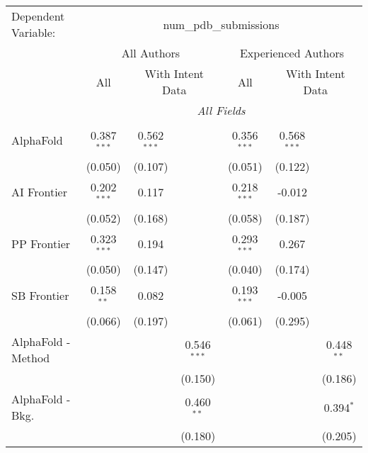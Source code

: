 \begingroup
\centering
\begin{tabular}{lcccccc}
   \tabularnewline \midrule \midrule
   Dependent Variable: & \multicolumn{6}{c}{num\_pdb\_submissions}\\
 & \multicolumn{3}{c}{All Authors} & \multicolumn{3}{c}{Experienced Authors} \\
\cmidrule(lr){2-4} \cmidrule(lr){5-7}
 & \multicolumn{1}{c}{All} & \multicolumn{2}{c}{With Intent Data} & \multicolumn{1}{c}{All} & \multicolumn{2}{c}{With Intent Data} \\
\cmidrule(lr){2-2} \cmidrule(lr){3-4} \cmidrule(lr){5-5} \cmidrule(lr){6-7}
 & \multicolumn{6}{c}{\textit{All Fields}} \\ \\
   AlphaFold                     & 0.387$^{***}$ & 0.562$^{***}$ &               & 0.356$^{***}$ & 0.568$^{***}$ &   \\   
                                 & (0.050)       & (0.107)       &               & (0.051)       & (0.122)       &   \\   
   AI Frontier                   & 0.202$^{***}$ & 0.117         &               & 0.218$^{***}$ & -0.012        &   \\   
                                 & (0.052)       & (0.168)       &               & (0.058)       & (0.187)       &   \\   
   PP Frontier                   & 0.323$^{***}$ & 0.194         &               & 0.293$^{***}$ & 0.267         &   \\   
                                 & (0.050)       & (0.147)       &               & (0.040)       & (0.174)       &   \\   
   SB Frontier                   & 0.158$^{**}$  & 0.082         &               & 0.193$^{***}$ & -0.005        &   \\   
                                 & (0.066)       & (0.197)       &               & (0.061)       & (0.295)       &   \\   
   AlphaFold - Method            &               &               & 0.546$^{***}$ &               &               & 0.448$^{**}$\\   
                                 &               &               & (0.150)       &               &               & (0.186)\\   
   AlphaFold - Bkg.              &               &               & 0.460$^{**}$  &               &               & 0.394$^{*}$\\   
                                 &               &               & (0.180)       &               &               & (0.205)\\   

\end{tabular}
